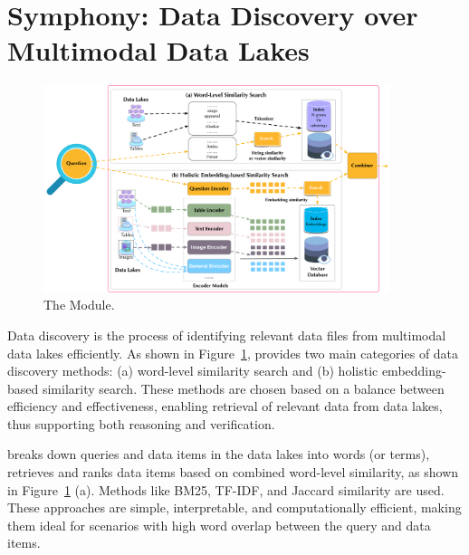 \section{Symphony: Data Discovery over Multimodal Data Lakes}
\label{sec:learning}

\begin{figure}[b!]
\begin{center}
\includegraphics[width=0.9\textwidth]{submissions/Nan2024/figs/discovery.pdf}
\vspace{-1em}
\caption{The \discovery Module.}
\label{fig:discovery}
\end{center}
\end{figure}



Data discovery is the process of identifying relevant data files from multimodal data lakes efficiently. As shown in Figure~\ref{fig:discovery}, \sys provides two main categories of data discovery methods: 
(a) word-level similarity search and 
(b) holistic embedding-based similarity search. These methods are chosen based on a balance between efficiency and effectiveness, enabling retrieval of relevant data from data lakes, thus supporting both reasoning and verification.

 breaks down queries and data items in the data lakes into words (or terms), retrieves and ranks data items based on combined word-level similarity, as shown in Figure~\ref{fig:discovery} (a). Methods like BM25, TF-IDF, and Jaccard similarity are used. These approaches are simple, interpretable, and computationally efficient, making them ideal for scenarios with high word overlap between the query and data items.

